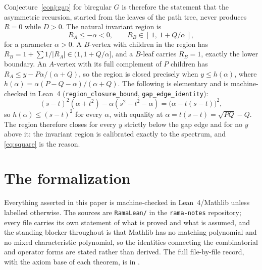 \documentclass[11pt]{article}
\theoremstyle{remark}
\begin{document}
Conjecture~\ref{conj:gap} for biregular $G$ is therefore the statement that the
asymmetric recursion, started from the leaves of the path tree, never produces
$R=0$ while $D>0$. The natural invariant region is
\[
R_A\le-\alpha<0,\qquad R_B\in[\,1,\ 1+Q/\alpha\,],
\]
for a parameter $\alpha>0$. A $B$-vertex with children in the region has
$R_B=1+\sum1/|R_A|\in(1,1+Q/\alpha]$, and a $B$-leaf carries $R_B=1$, exactly
the lower boundary. An $A$-vertex with its full complement of $P$ children has
$R_A\le y-P\alpha/(\alpha+Q)$, so the region is closed precisely when
$y\le h(\alpha)$, where $h(\alpha)=\alpha(P-Q-\alpha)/(\alpha+Q)$. The
following is elementary and is machine-checked in Lean~4
(\texttt{region\_closure\_bound}, \texttt{gap\_edge\_identity}):
\begin{equation}\label{eq:square}
(s-t)^2(\alpha+t^2)-\alpha(s^2-t^2-\alpha)=\bigl(\alpha-t(s-t)\bigr)^2 ,
\end{equation}
so $h(\alpha)\le(s-t)^2$ for every $\alpha$, with equality at
$\alpha=t(s-t)=\sqrt{PQ}-Q$. The region therefore closes for every $y$ strictly
below the gap edge and for no $y$ above it: the invariant region is calibrated
exactly to the spectrum, and \eqref{eq:square} is the reason.


\section{The formalization}

Everything asserted in this paper is machine-checked in Lean~4/Mathlib unless labelled
otherwise. The sources are \texttt{RamaLean/} in the \texttt{rama-notes} repository; every file
carries its own statement of what is proved and what is assumed, and the standing blocker
throughout is that Mathlib has no matching polynomial and no mixed characteristic polynomial, so
the identities connecting the combinatorial and operator forms are stated rather than derived.
The full file-by-file record, with the axiom base of each theorem, is in \cite{Supp2}.
\end{document}
